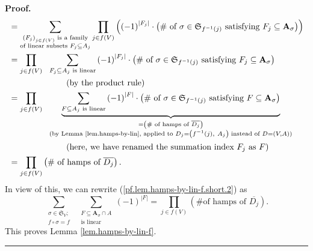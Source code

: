 \documentclass[numbers=enddot,12pt,final,onecolumn,notitlepage]{scrartcl}%
\numberwithin{exer}{section}
\theoremstyle{definition}
\newenvironment{proof}[1][Proof]{\noindent\textbf{#1.} }{\ \rule{0.5em}{0.5em}}
\let\sumnonlimits\sum
\let\prodnonlimits\prod
\renewcommand{\sum}{\sumnonlimits\limits}
\renewcommand{\prod}{\prodnonlimits\limits}
\newenvironment{vershort}{}{}
\begin{document}
\begin{vershort}
\begin{proof}
\begin{align*}
&  =\sum_{\substack{\left(  F_{j}\right)  _{j\in f\left(  V\right)  }\text{ is
a family}\\\text{of linear subsets }F_{j}\subseteq A_{j}}}\prod_{j\in f\left(
V\right)  }\left(  \left(  -1\right)  ^{\left\vert F_{j}\right\vert }%
\cdot\left(  \text{\# of }\sigma\in\mathfrak{S}_{f^{-1}\left(  j\right)
}\text{ satisfying }F_{j}\subseteq\mathbf{A}_{\sigma}\right)  \right) \\
&  =\prod_{j\in f\left(  V\right)  }\ \ \sum_{\substack{F_{j}\subseteq
A_{j}\text{ is linear}}}\left(  -1\right)  ^{\left\vert F_{j}\right\vert
}\cdot\left(  \text{\# of }\sigma\in\mathfrak{S}_{f^{-1}\left(  j\right)
}\text{ satisfying }F_{j}\subseteq\mathbf{A}_{\sigma}\right) \\
&  \ \ \ \ \ \ \ \ \ \ \ \ \ \ \ \ \ \ \ \ \left(  \text{by the product
rule}\right) \\
&  =\prod_{j\in f\left(  V\right)  }\ \ \underbrace{\sum_{\substack{F\subseteq
A_{j}\text{ is linear}}}\left(  -1\right)  ^{\left\vert F\right\vert }%
\cdot\left(  \text{\# of }\sigma\in\mathfrak{S}_{f^{-1}\left(  j\right)
}\text{ satisfying }F\subseteq\mathbf{A}_{\sigma}\right)  }%
_{\substack{=\left(  \text{\# of hamps of }\overline{D_{j}}\right)
\\\text{(by Lemma \ref{lem.hamps-by-lin}, applied to }D_{j}=\left(
f^{-1}\left(  j\right)  ,\ A_{j}\right)  \text{ instead of }D=\left(
V,A\right)  \text{)}}}\\
&  \ \ \ \ \ \ \ \ \ \ \ \ \ \ \ \ \ \ \ \ \left(  \text{here, we have renamed
the summation index }F_{j}\text{ as }F\right) \\
&  =\prod_{j\in f\left(  V\right)  }\left(  \text{\# of hamps of }%
\overline{D_{j}}\right)  .
\end{align*}
In view of this, we can rewrite (\ref{pf.lem.hamps-by-lin-f.short.2}) as%
\[
\sum_{\substack{\sigma\in\mathfrak{S}_{V};\\f\circ\sigma=f}}\ \ \sum
_{\substack{F\subseteq\mathbf{A}_{\sigma}\cap A\\\text{is linear}}}\left(
-1\right)  ^{\left\vert F\right\vert }=\prod_{j\in f\left(  V\right)  }\left(
\text{\# of hamps of }\overline{D_{j}}\right)  .
\]
This proves Lemma \ref{lem.hamps-by-lin-f}.
\end{proof}
\end{vershort}
\end{document}
